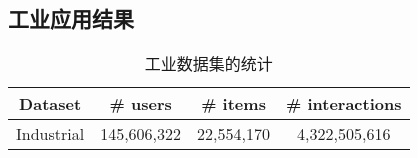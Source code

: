 

\subsection{工业应用结果}

\begin{table}
  \centering
  \caption{\label{tab:industrial_stats} 工业数据集的统计}
  \begin{tabular}{c|c|c|c}
    \hline \hline
    \textbf{Dataset} & \# users & \# items & \# interactions \\
    \hline
    Industrial & 145,606,322 & 22,554,170 & 4,322,505,616 \\
    \hline \hline
  \end{tabular}
\end{table}




